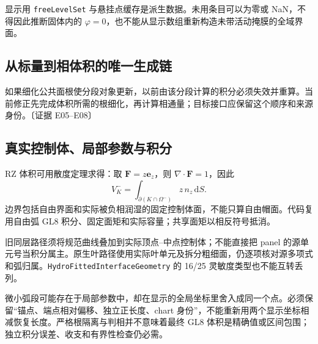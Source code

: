 \documentclass[UTF8,a4paper,11pt,fontset=fandol]{ctexart}
\newcommand{\code}[1]{\nolinkurl{#1}}
\newcommand{\ev}[1]{{\small\color{muted}〔证据 #1〕}}
\newcommand{\dd}{\,\mathrm d}
\newcommand{\ph}{\varphi}\newcommand{\dt}{\Delta t}
\begin{document}
显示用 \code{freeLevelSet} 与悬挂点缓存是派生数据。未用条目可以为零或 NaN，不得因此推断固体内的 $\ph=0$，也不能从显示数组重新构造未带活动掩膜的全域界面。

\subsection{从标量到相体积的唯一生成链}
\begin{center}
\end{center}
如果细化公共面根使分段对象更新，以前由该分段计算的积分必须失效并重算。当前修正先完成体积所需的根细化，再计算相通量；目标接口应保留这个顺序和来源身份。\ev{E05--E08}

\subsection{真实控制体、局部参数与积分}
RZ 体积可用散度定理求得：取 $\bm F=z\bm e_z$，则 $\nabla\cdot\bm F=1$，因此
\begin{equation}
 V_K^-=\int_{\partial(K\cap\Omega^-)}z\,n_z\dd S.
 \label{eq:moment}
\end{equation}
边界包括自由界面和实际被负相润湿的固定控制体面，不能只算自由帽面。代码复用自由弧 GL8 积分、固定面矩和实际容量；共享面矩以相反符号抵消。

旧同层路径须将规范曲线叠加到实际顶点--中点控制体；不能直接把 panel 的源单元号当积分属主。原生叶路径使用实际叶单元及拆分粗细面，仍逐项核对源多项式和弧归属。\code{HydroFittedInterfaceGeometry} 的 16/25 灵敏度类型也不能互转丢列。

微小弧段可能存在于局部参数中，却在显示的全局坐标里舍入成同一个点。必须保留“锚点、端点相对偏移、独立正长度、chart 身份”，不能重新用两个显示坐标相减恢复长度。严格根隔离与判相并不意味着最终 GL8 体积是精确值或区间包围；独立积分误差、收支和有界性检查仍必需。
\end{document}
